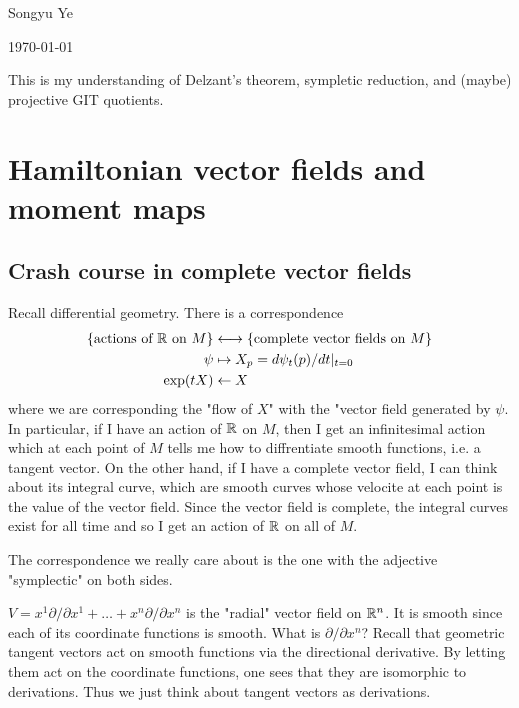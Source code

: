 \documentclass[12pt]{article}
\begin{document}
Songyu Ye

\today

\hfill

This is my understanding of Delzant's theorem, sympletic reduction, and (maybe) projective GIT quotients.

\section{Hamiltonian vector fields and moment maps}
\subsection{Crash course in complete vector fields}
Recall differential geometry. There is a correspondence \begin{align*}
	\{\text{actions of $\mathbb{R}$ on $M$}\} & \longleftrightarrow \{\text{complete vector fields on $M$}\} \\
	\psi                                & \mapsto X_p = d\psi_t(p)/dt|_{t=0}                             \\
	\exp(tX)                            & \leftarrow X
\end{align*} where we are corresponding the "flow of $X$" with the "vector field generated by $\psi$.
In particular, if I have an action of $\mathbb{R}$ on $M$, then I get an infinitesimal action which at each point of $M$
tells me how to diffrentiate smooth functions, i.e. a tangent vector. On the other hand, if I have a complete vector field,
I can think about its integral curve, which are smooth curves whose velocite at each point is the value
of the vector field. Since the vector field is complete, the integral curves exist for all time
and so I get an action of $\mathbb{R}$ on all of $M$.

\hfill

The correspondence we really care about is the one with the adjective "symplectic" on both sides.

\begin{example}
	$V = x^1\partial/\partial x^1 + \dots + x^n \partial/\partial x^n$ is the "radial" vector field on $\mathbb{R}^n$.
	It is smooth since each of its coordinate functions is smooth. What is $\partial/\partial x^n$?
	Recall that geometric tangent vectors act on smooth functions via the directional derivative.
	By letting them act on the coordinate functions, one sees that they are isomorphic to derivations. Thus
	we just think about tangent vectors as derivations.
\end{example}
\end{document}
